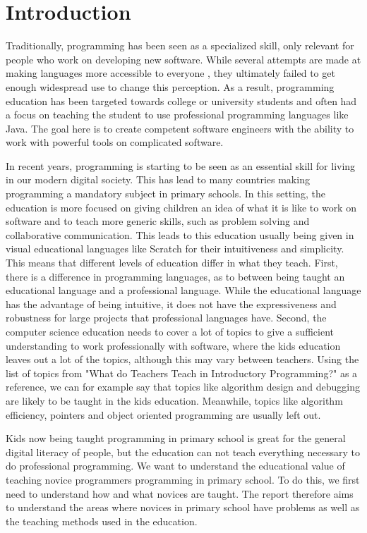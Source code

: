 \chapter{Introduction}
\label{chap:introduction}
Traditionally, programming has been seen as a specialized skill, only relevant for people who work on developing new software.
While several attempts are made at making languages more accessible to everyone \cite{turtle_func, smallbasic_faq}, they ultimately failed to get enough widespread use to change this perception.
As a result, programming education has been targeted towards college or university students and often had a focus on teaching the student to use professional programming languages like Java\cite{tiobe}.
The goal here is to create competent software engineers with the ability to work with powerful tools on complicated software.

In recent years, programming is starting to be seen as an essential skill for living in our modern digital society.
This has lead to many countries making programming a mandatory subject in primary schools. In this setting, the education is more focused on giving children an idea of what it is like to work on software and to teach more generic skills, such as problem solving and collaborative communication. This leads to this education usually being given in visual educational languages like Scratch \cite{MaloneyResnick10} for their intuitiveness and simplicity. This means that different levels of education differ in what they teach.
First, there is a difference in programming languages, as to between being taught an educational language and a professional language. While the educational language has the advantage of being intuitive, it does not have the expressiveness and robustness for large projects that professional languages have.
Second, the computer science education needs to cover a lot of topics to give a sufficient understanding to work professionally with software, where the kids education leaves out a lot of the topics, although this may vary between teachers.
Using the list of topics from "What do Teachers Teach in Introductory Programming?"\cite{WhatDoTeach06} as a reference, we can for example say that topics like algorithm design and debugging are likely to be taught in the kids education. Meanwhile, topics like algorithm efficiency, pointers and object oriented programming are usually left out.

Kids now being taught programming in primary school is great for the general digital literacy of people, but the education can not teach everything necessary to do professional programming.
We want to understand the educational value of teaching novice programmers programming in primary school. To do this, we first need to understand how and what novices are taught. The report therefore aims to understand the areas where novices in primary school have problems as well as the teaching methods used in the education.

